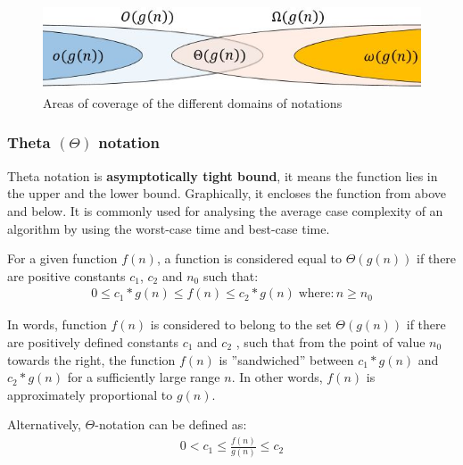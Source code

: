 \documentclass[10pt,a4paper]{article}
\begin{document}
\begin{figure} [h!]
    \centering
    \includegraphics[scale=0.7]{little omega.JPG}
    \caption{Areas of coverage of the different domains of notations}
\end{figure}

\pagebreak

\subsubsection{Theta $(\Theta)$ notation}

Theta notation is \textbf{asymptotically tight bound}, it means the function lies in
the upper and the lower bound. Graphically, it encloses the function from above
and below. It is commonly used for analysing the average case complexity of an
algorithm by using the worst-case time and best-case time.

\begin{tcolorbox}[breakable,colback=white]
For a given function $f(n)$, a function is considered equal to $\Theta(g(n))$ if
there are positive constants $c_1$, $c_2$ and $n_0$ such that:
\begin{align*}
    0 \leq c_1 * g(n) \leq f(n) \leq c_2 * g(n) \; \text{where}: n \geq n_0
\end{align*}
\end{tcolorbox}

In words, function $f(n)$ is considered to belong to the set $\Theta(g(n))$ if there
are positively deﬁned constants $c_1$ and $c_2$ , such that from the point of value
$n_0$ towards the right, the function $f(n)$ is ”sandwiched” between $c_1* g(n)$ and
$c_2 * g(n)$ for a suﬃciently large range $n$. In other words, $f(n)$ is approximately
proportional to $g(n)$.

\begin{tcolorbox}[breakable,colback=white]
    Alternatively, $\Theta$-notation can be deﬁned as:
    \begin{align*}
        0 < c_1 \leq \frac{f(n)}{g(n)} \leq c_2
    \end{align*}
\end{tcolorbox}
\end{document}
